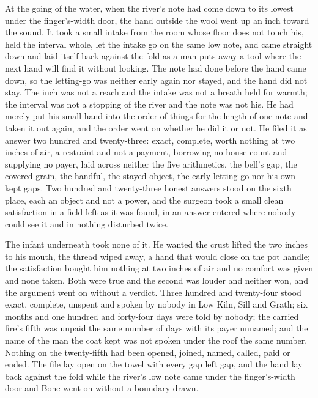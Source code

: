 At the going of the water, when the river's note had come down to its lowest under the finger's-width door, the hand outside the wool went up an inch toward the sound. It took a small intake from the room whose floor does not touch his, held the interval whole, let the intake go on the same low note, and came straight down and laid itself back against the fold as a man puts away a tool where the next hand will find it without looking. The note had done before the hand came down, so the letting-go was neither early again nor stayed, and the hand did not stay. The inch was not a reach and the intake was not a breath held for warmth; the interval was not a stopping of the river and the note was not his. He had merely put his small hand into the order of things for the length of one note and taken it out again, and the order went on whether he did it or not. He filed it as answer two hundred and twenty-three: exact, complete, worth nothing at two inches of air, a restraint and not a payment, borrowing no house count and supplying no payer, laid across neither the five arithmetics, the bell's gap, the covered grain, the handful, the stayed object, the early letting-go nor his own kept gaps. Two hundred and twenty-three honest answers stood on the sixth place, each an object and not a power, and the surgeon took a small clean satisfaction in a field left as it was found, in an answer entered where nobody could see it and in nothing disturbed twice.

The infant underneath took none of it. He wanted the crust lifted the two inches to his mouth, the thread wiped away, a hand that would close on the pot handle; the satisfaction bought him nothing at two inches of air and no comfort was given and none taken. Both were true and the second was louder and neither won, and the argument went on without a verdict. Three hundred and twenty-four stood exact, complete, unspent and spoken by nobody in Low Kiln, Sill and Grath; six months and one hundred and forty-four days were told by nobody; the carried fire's fifth was unpaid the same number of days with its payer unnamed; and the name of the man the coat kept was not spoken under the roof the same number. Nothing on the twenty-fifth had been opened, joined, named, called, paid or ended. The file lay open on the towel with every gap left gap, and the hand lay back against the fold while the river's low note came under the finger's-width door and Bone went on without a boundary drawn.
